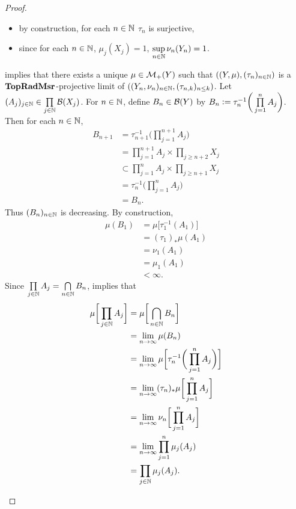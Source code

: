 \documentclass{book}
\begin{document}
\begin{proof}
\begin{itemize}
\begin{itemize}
				\item by construction, for each $n \in \mathbb{N}$ $\tau_n$ is surjective,
				\item since for each $n \in \mathbb{N}$, $\mu_j(X_j) = 1$, $\sup\limits_{n \in \mathbb{N}} \nu_n(Y_n) = 1$.
			\end{itemize}
			 implies that there exists a unique $\mu \in \mathcal{M}_+(Y)$ such that $((Y, \mu), (\tau_n)_{n \in \mathbb{N}})$ is a $\operatorname{\text{\textbf{TopRadMsr}}}$-projective limit of $((Y_n, \nu_n)_{n \in \mathbb{N}}, (\tau_{n,k})_{n \leq k})$. Let $(A_j)_{j \in \mathbb{N}} \in \prod\limits_{j \in \mathbb{N}} \mathcal{B}(X_j)$. For $n \in \mathbb{N}$, define $B_n \in \mathcal{B}(Y)$ by $B_n \vcentcolon= \tau_n^{-1} \bigg( \prod\limits_{j=1}^n A_j \bigg)$. Then for each $n \in \mathbb{N}$, 
			\begin{align*}
				B_{n+1}
				& = \tau_{n+1}^{-1} \bigg( \prod\limits_{j=1}^{n+1} A_j \bigg) \\
				& = \prod\limits_{j=1}^{n+1} A_j \times \prod\limits_{j \geq n+2} X_j \\
				& \subset \prod\limits_{j=1}^n A_j \times \prod\limits_{j \geq n+1} X_j \\
				& = \tau_n^{-1} \bigg( \prod\limits_{j=1}^n A_j \bigg) \\
				& = B_n.
			\end{align*}
			Thus $(B_n)_{n \in \mathbb{N}}$ is decreasing. By construction, 
			\begin{align*}
				\mu(B_1)
				& = \mu \bigg[ \tau_1^{-1} (A_1) \bigg] \\
				& = (\tau_1)_* \mu(A_1) \\
				& = \nu_1(A_1) \\
				& = \mu_1(A_1) \\
				& < \infty. 
			\end{align*}	
			Since $\prod\limits_{j \in \mathbb{N}} A_j = \bigcap\limits_{n \in \mathbb{N}} B_n$,  implies that
			\begin{align*}
				\mu \bigg[ \prod_{j \in \mathbb{N}} A_j \bigg]
				& = \mu \bigg[ \bigcap\limits_{n \in \mathbb{N}} B_n \bigg] \\
				& = \lim_{n \rightarrow \infty} \mu (B_n) \\
				& = \lim_{n \rightarrow \infty} \mu \bigg[ \tau_n^{-1} \bigg( \prod\limits_{j=1}^n A_j \bigg) \bigg] \\
				& = \lim_{n \rightarrow \infty} (\tau_n)_*\mu \bigg[ \prod\limits_{j=1}^n A_j  \bigg] \\
				& = \lim_{n \rightarrow \infty} \nu_n \bigg[ \prod\limits_{j=1}^n A_j  \bigg] \\
				& = \lim_{n \rightarrow \infty} \prod_{j=1}^n \mu_j(A_j) \\
				& = \prod_{j \in \mathbb{N}} \mu_j(A_j).
			\end{align*}
			

\end{itemize}
\end{proof}
\end{document}
